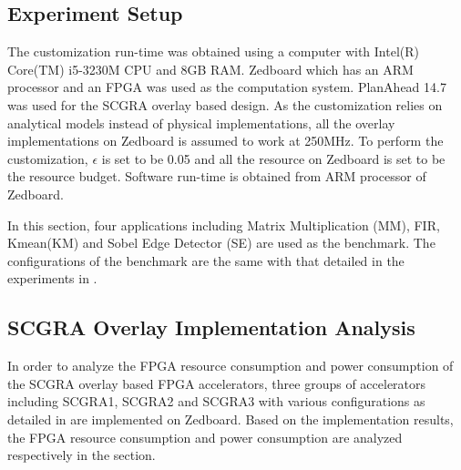 \subsection{Experiment Setup}
The customization run-time was obtained using a computer with Intel(R) Core(TM) i5-3230M CPU and 8GB RAM. Zedboard which has an ARM processor and an FPGA was used as the computation system. PlanAhead 14.7 was used for the SCGRA overlay based design. As the customization relies on analytical models instead of physical implementations, all the overlay implementations on Zedboard is assumed to work at 250MHz. To perform the customization, $\epsilon$ is set to be 0.05 and all the resource on Zedboard is set to be the resource budget. Software run-time is obtained from ARM processor of Zedboard.

In this section, four applications including Matrix Multiplication (MM), FIR, Kmean(KM) and Sobel Edge Detector (SE) are used as the benchmark. The configurations of the benchmark are the same with that detailed in the experiments in . 

\subsection{SCGRA Overlay Implementation Analysis}
In order to analyze the FPGA resource consumption and power consumption of the SCGRA overlay based FPGA accelerators, three groups of accelerators including SCGRA1, SCGRA2 and SCGRA3 with various configurations as detailed in  are implemented on Zedboard. Based on the implementation results, the FPGA resource consumption and power consumption are analyzed respectively in the section.

